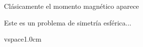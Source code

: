 \question [1] Clásicamente el momento magnético aparece

\begin{solution}
Este es un problema de simetría esférica...



\end{solution}

vspace{1.0cm}